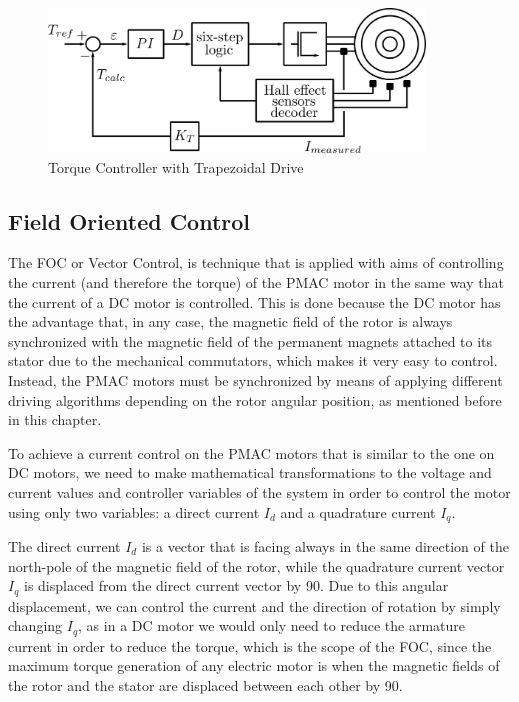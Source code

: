 \begin{figure}[htbp]
\centering
\includegraphics[width=10cm]{Images/torque_trapezoidal.png} 
\caption[Torque Controller with Trapezoidal Drive]{Torque Controller with Trapezoidal Drive}
\label{fig:torque_trapezoidal}
\end{figure}

\subsection{Field Oriented Control}

The \acf{FOC} or Vector Control, is technique that is applied with aims of controlling the current (and therefore the torque) of the \ac{PMAC} motor in the same way that the current of a \ac{DC} motor is controlled. This is done because the \ac{DC} motor has the advantage that, in any case, the magnetic field of the rotor is always synchronized with the magnetic field of the permanent magnets attached to its stator due to the mechanical commutators, which makes it very easy to control. Instead, the \ac{PMAC} motors must be synchronized by means of applying different driving algorithms depending on the rotor angular position, as mentioned before in this chapter. 

To achieve a current control on the \ac{PMAC} motors that is similar to the one on \ac{DC} motors, we need to make mathematical transformations to the voltage and current values and controller variables of the system in order to control the motor using only two variables: a direct current $I_{d}$ and a quadrature current $I_{q}$.

The direct current $I_{d}$ is a vector that is facing always in the same direction of the north-pole of the magnetic field of the rotor, while the quadrature current vector $I_{q}$ is displaced from the direct current vector by 90\degree. Due to this angular displacement, we can control the current and the direction of rotation by simply changing $I_{q}$, as in a \ac{DC} motor we would only need to reduce the armature current in order to reduce the torque, which is the scope of the \ac{FOC}, since the maximum torque generation of any electric motor is when the magnetic fields of the rotor and the stator are displaced between each other by 90\degree.

